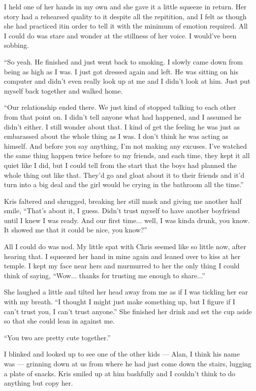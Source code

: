 I held one of her hands in my own and she gave it a little squeeze in return.  Her story had a rehearsed quality to it despite all the repitition, and I felt as though she had practiced itin order to tell it with the minimum of emotion required.  All I could do was stare and wonder at the stillness of her voice.  I would've been sobbing.

``So yeah.  He finished and just went back to smoking.  I slowly came down from being as high as I was.  I just got dressed again and left.  He was sitting on his computer and didn't even really look up at me and I didn't look at him.  Just put myself back together and walked home.

``Our relationship ended there.  We just kind of stopped talking to each other from that point on.  I didn't tell anyone what had happened, and I assumed he didn't either.  I still wonder about that.  I kind of get the feeling he was just as embarassed about the whole thing as I was.  I don't think he was acting as himself.  And before you say anything, I'm not making any excuses.  I've watched the same thing happen twice before to my friends, and each time, they kept it all quiet like I did, but I could tell from the start that the boys had planned the whole thing out like that.  They'd go and gloat about it to their friends and it'd turn into a big deal and the girl would be crying in the bathroom all the time.''

Kris faltered and shrugged, breaking her still mask and giving me another half smile, ``That's about it, I guess.  Didn't trust myself to have another boyfriend until I knew I was ready.  And our first time... well, I was kinda drunk, you know.  It showed me that it could be nice, you know?''

All I could do was nod.  My little spat with Chris seemed like so little now, after hearing that.  I squeezed her hand in mine again and leaned over to kiss at her temple.  I kept my face near hers and murmurred to her the only thing I could think of saying, ``Wow... thanks for trusting me enough to share...''

She laughed a little and tilted her head away from me as if I was tickling her ear with my breath.  ``I thought I might just make something up, but I figure if I can't trust you, I can't trust anyone.''  She finished her drink and set the cup aside so that she could lean in against me.

``You two are pretty cute together.''

I blinked and looked up to see one of the other kids --- Alan, I think his name was --- grinning down at us from where he had just come down the stairs, lugging a plate of snacks.  Kris smiled up at him bashfully and I couldn't think to do anything but copy her.

